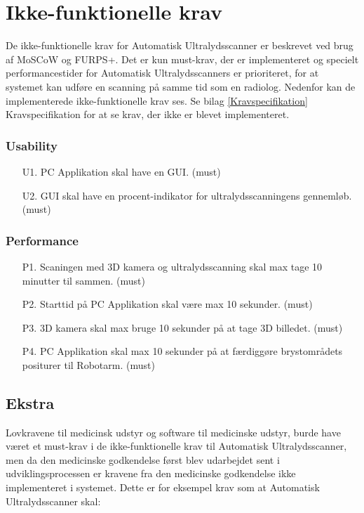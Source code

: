 \section{Ikke-funktionelle krav}
De ikke-funktionelle krav for Automatisk Ultralydsscanner er beskrevet ved brug af MoSCoW og FURPS+. Det er kun must-krav, der er implementeret og specielt performancestider for Automatisk Ultralydsscanners er prioriteret, for at systemet kan udføre en scanning på samme tid som en radiolog. Nedenfor kan de implementerede ikke-funktionelle krav ses. Se bilag \ref{Kravspecifikation} Kravspecifikation for at se krav, der ikke er blevet implementeret. 

\subsubsection{Usability}
\begin{itemize}
    \item [U1.] PC Applikation skal have en GUI. (must)
     \item[U2.] GUI skal have en procent-indikator for ultralydsscanningens gennemløb. (must)
\end{itemize}

\subsubsection{Performance}
\begin{itemize}
    \item[P1.] Scaningen med 3D kamera og ultralydsscanning skal max tage 10 minutter til sammen. (must) 
    \item[P2.] Starttid på PC Applikation skal være max 10 sekunder. (must)
    \item[P3.] 3D kamera skal max bruge 10 sekunder på at tage 3D billedet. (must)
    \item[P4.] PC Applikation skal max 10 sekunder på at færdiggøre brystområdets positurer til Robotarm. (must)
\end{itemize}

\subsection{Ekstra}
Lovkravene til medicinsk udstyr og software til medicinske udstyr, burde have været et must-krav i de ikke-funktionelle krav til Automatisk Ultralydsscanner, men da den medicinske godkendelse først blev udarbejdet sent i udviklingsprocessen er kravene fra den medicinske godkendelse ikke implementeret i systemet. Dette er for eksempel krav som at Automatisk Ultralydsscanner skal: 

